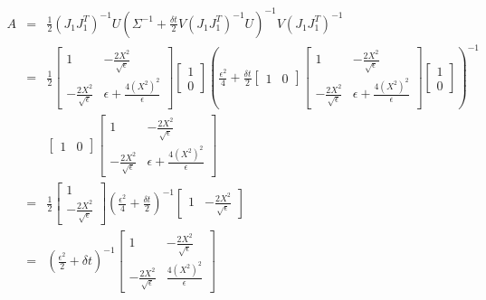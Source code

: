 \documentclass[12pt]{article}
\begin{document}
\begin{eqnarray}
A &=& 
\frac{1}{2} (J_1 J_1^T)^{-1} U \left(\Sigma^{-1} + \frac{\delta t}{2} V \left( J_1 J_1^T \right)^{-1} U \right)^{-1} V \left( J_1 J_1^T \right)^{-1} \\
&=& \frac{1}{2} 
\begin{bmatrix} 1 & -\frac{2X^2}{\sqrt{\epsilon}} \\ -\frac{2X^2}{\sqrt{\epsilon}} & \epsilon+\frac{4 \left( X^2 \right)^2}{\epsilon} \end{bmatrix}
\begin{bmatrix} 1 \\ 0 \end{bmatrix}
\left( \frac{\epsilon^2}{4} + 
\frac{\delta t}{2} 
\begin{bmatrix} 1 & 0 \end{bmatrix}
\begin{bmatrix} 1 & -\frac{2X^2}{\sqrt{\epsilon}} \\ -\frac{2X^2}{\sqrt{\epsilon}} & \epsilon+\frac{4 \left( X^2 \right)^2}{\epsilon} \end{bmatrix}
\begin{bmatrix} 1 \\ 0 \end{bmatrix}
\right)^{-1} \\
&&\begin{bmatrix} 1 & 0 \end{bmatrix}
\begin{bmatrix} 1 & -\frac{2X^2}{\sqrt{\epsilon}} \\ -\frac{2X^2}{\sqrt{\epsilon}} & \epsilon+\frac{4 \left( X^2 \right)^2}{\epsilon} \end{bmatrix} \\
&=& \frac{1}{2} 
\begin{bmatrix} 1 \\ -\frac{2X^2}{\sqrt{\epsilon}} \end{bmatrix}
\left( \frac{\epsilon^2}{4} + 
\frac{\delta t}{2} 
\right)^{-1} 
\begin{bmatrix} 1 & -\frac{2X^2}{\sqrt{\epsilon}} \end{bmatrix} \\
&=& \left( \frac{\epsilon^2}{2} + 
\delta t
\right)^{-1} 
\begin{bmatrix}
1 & -\frac{2X^2}{\sqrt{\epsilon}} \\ -\frac{2X^2}{\sqrt{\epsilon}} & \frac{4\left(X^2 \right)^2}{\epsilon}
\end{bmatrix}
\end{eqnarray}
\end{document}
